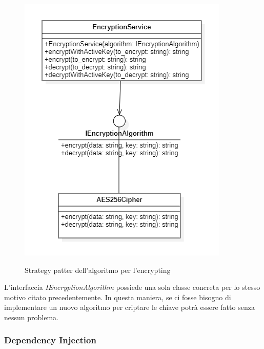 \begin{figure}[H]
    \centering
    \includegraphics[scale = 0.8]{img/cryptStrategy.png}\\
    \caption{Strategy patter dell'algoritmo per l'encrypting}
\end{figure}

L'interfaccia \textit{IEncryptionAlgorithm} possiede una sola classe concreta per lo stesso motivo citato precedentemente. In questa maniera, se ci fosse bisogno di implementare un nuovo algoritmo per criptare le chiave potrà essere fatto senza nessun problema.

\subsubsection{Dependency Injection}

